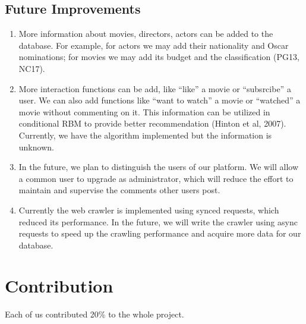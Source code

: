 \begin{CJK*}{UTF8}{gbsn}
\subsection{Future Improvements}
\begin{enumerate}
\item More information about movies, directors, actors can be added to the database. For example, for actors we may add their nationality and Oscar nominations; for movies we may add its budget and the classification (PG13, NC17).
\item More interaction functions can be add, like ``like'' a movie or ``subsrcibe'' a user. We can also add functions like ``want to watch'' a movie or ``watched'' a movie without commenting on it. This information can be utilized in conditional RBM to provide better recommendation (Hinton et al, 2007). Currently, we have the algorithm implemented but the information is unknown. 
\item In the future, we plan to distinguish the users of our platform. We will allow a common user to upgrade as administrator, which will reduce the effort to maintain and supervise the comments other users post.
\item Currently the web crawler is implemented using synced requests, which reduced its performance. In the future, we will write the crawler using async requests to speed up the crawling performance and acquire more data for our database.
\end{enumerate}

\section{Contribution}
Each of us contributed 20\% to the whole project.







\end{CJK*}

